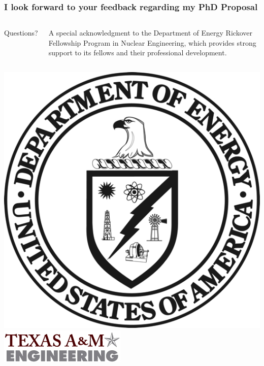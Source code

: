 \documentclass[compress,10pt]{beamer}
\newlength \figwidth
\begin{document}
\begin{frame}[plain]
   \frametitle{I look forward to your feedback regarding my PhD Proposal}

\vspace{25mm}

\begin{columns}[b]




\centering

{\Large Questions?}

\vspace{9mm}
\footnotesize
A special acknowledgment to the Department of Energy Rickover Fellowship Program in Nuclear Engineering, which provides strong support to its fellows and their professional development.

\end{columns}

\vspace{10mm}

\begin{columns}[b]

\centering
{}\includegraphics[width=0.35\figwidth]{images/DOE_logo.png}\\

\centering
{}\includegraphics[width=0.70\figwidth]{images/tamu_engineering.png}\\

\end{columns}

\end{frame}
\end{document}
